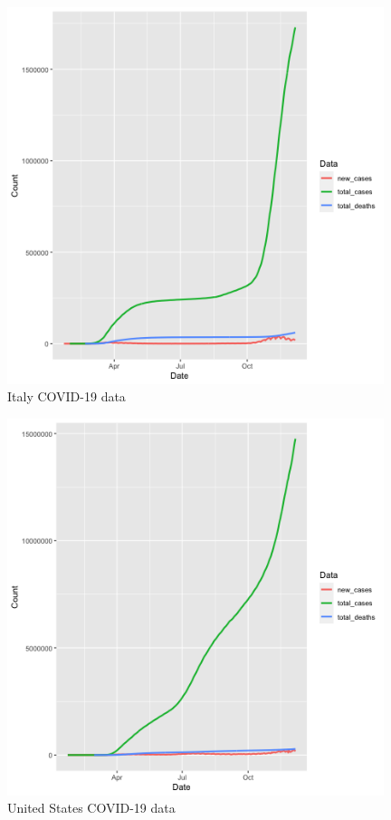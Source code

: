 \documentclass[11pt]{article}
\begin{document}
\begin{figure}[!h]
\centering
  \includegraphics[width=110mm]{R-Code/plots/italyCovid.png}  
  \caption{Italy COVID-19 data}
  \end{figure}

\begin{figure}[!h]
\centering
  \includegraphics[width=110mm]{R-Code/plots/usaCovid.png} 
  \caption{United States COVID-19 data}
\end{figure}

\clearpage
\medskip
\newpage

\nocite{*} 
 
\end{document}
